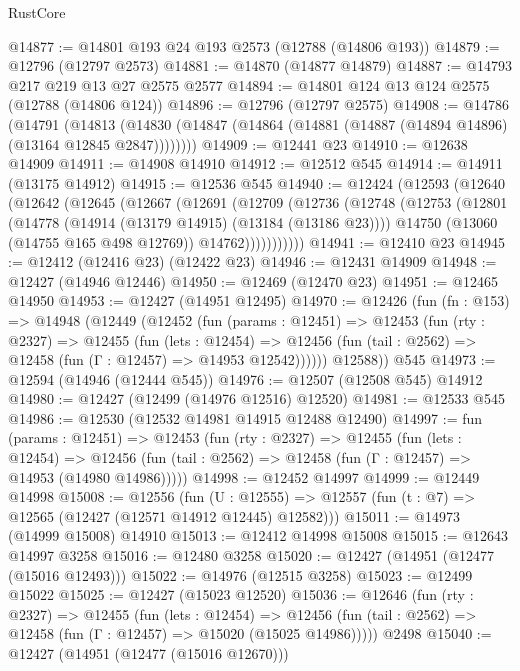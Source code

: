 \begin{lexlean}{RustCore}
\begin{coremodule}
@14877 := @14801 @193 @24 @193 @2573 (@12788 (@14806 @193))
@14879 := @12796 (@12797 @2573)
@14881 := @14870 (@14877 @14879)
@14887 := @14793 @217 @219 @13 @27 @2575 @2577
@14894 := @14801 @124 @13 @124 @2575 (@12788 (@14806 @124))
@14896 := @12796 (@12797 @2575)
@14908 := @14786
    (@14791
      (@14813 (@14830 (@14847 (@14864 (@14881 (@14887 (@14894 @14896) (@13164 @12845 @2847))))))))
@14909 := @12441 @23
@14910 := @12638 @14909
@14911 := @14908 @14910
@14912 := @12512 @545
@14914 := @14911 (@13175 @14912)
@14915 := @12536 @545
@14940 := @12424
    (@12593
      (@12640
        (@12642
          (@12645
            (@12667
              (@12691
                (@12709
                  (@12736
                    (@12748
                      (@12753
                        (@12801
                          (@14778 (@14914 (@13179 @14915) (@13184 (@13186 @23))))
                          @14750
                          (@13060 (@14755 @165 @498 @12769))
                          @14762)))))))))))
@14941 := @12410 @23
@14945 := @12412 (@12416 @23) (@12422 @23)
@14946 := @12431 @14909
@14948 := @12427 (@14946 @12446)
@14950 := @12469 (@12470 @23)
@14951 := @12465 @14950
@14953 := @12427 (@14951 @12495)
@14970 := @12426
    (fun (fn : @153) =>
    @14948
      (@12449
        (@12452
          (fun (params : @12451) =>
          @12453
            (fun (rty : @2327) =>
            @12455
              (fun (lets : @12454) =>
              @12456 (fun (tail : @2562) => @12458 (fun (Γ : @12457) => @14953 @12542))))))
        @12588))
    @545
@14973 := @12594 (@14946 (@12444 @545))
@14976 := @12507 (@12508 @545) @14912
@14980 := @12427 (@12499 (@14976 @12516) @12520)
@14981 := @12533 @545
@14986 := @12530 (@12532 @14981 @14915 @12488 @12490)
@14997 := fun (params : @12451) =>
  @12453
    (fun (rty : @2327) =>
    @12455
      (fun (lets : @12454) =>
      @12456 (fun (tail : @2562) => @12458 (fun (Γ : @12457) => @14953 (@14980 @14986)))))
@14998 := @12452 @14997
@14999 := @12449 @14998
@15008 := @12556
    (fun (U : @12555) => @12557 (fun (t : @7) => @12565 (@12427 (@12571 @14912 @12445) @12582)))
@15011 := @14973 (@14999 @15008) @14910
@15013 := @12412 @14998 @15008
@15015 := @12643 @14997 @3258
@15016 := @12480 @3258
@15020 := @12427 (@14951 (@12477 (@15016 @12493)))
@15022 := @14976 (@12515 @3258)
@15023 := @12499 @15022
@15025 := @12427 (@15023 @12520)
@15036 := @12646
    (fun (rty : @2327) =>
    @12455
      (fun (lets : @12454) =>
      @12456 (fun (tail : @2562) => @12458 (fun (Γ : @12457) => @15020 (@15025 @14986)))))
    @2498
@15040 := @12427 (@14951 (@12477 (@15016 @12670)))

\end{coremodule}
\end{lexlean}
